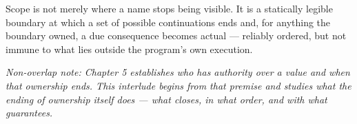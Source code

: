\documentclass[11pt]{book}
\begin{document}
\begin{invariantbox}
Scope is not merely where a name stops being visible. It is a statically legible boundary at which a set of possible continuations ends and, for anything the boundary owned, a due consequence becomes actual --- reliably ordered, but not immune to what lies outside the program's own execution.
\end{invariantbox}

\bigskip
\noindent\textit{Non-overlap note: Chapter 5 establishes who has authority over a value and when that ownership ends. This interlude begins from that premise and studies what the ending of ownership itself does --- what closes, in what order, and with what guarantees.}
\end{document}
